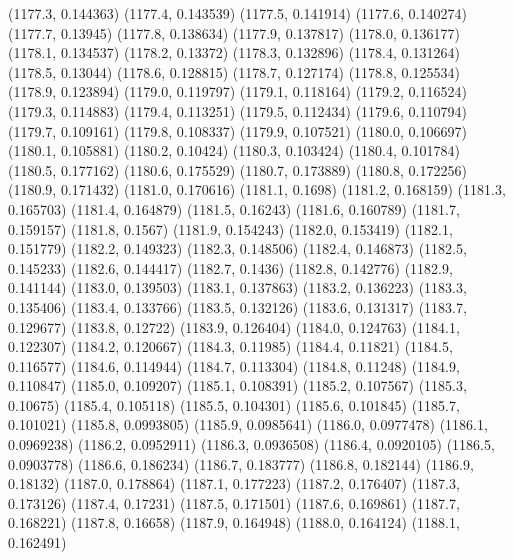{					(1177.3, 0.144363)
					(1177.4, 0.143539)
					(1177.5, 0.141914)
					(1177.6, 0.140274)
					(1177.7, 0.13945)
					(1177.8, 0.138634)
					(1177.9, 0.137817)
					(1178.0, 0.136177)
					(1178.1, 0.134537)
					(1178.2, 0.13372)
					(1178.3, 0.132896)
					(1178.4, 0.131264)
					(1178.5, 0.13044)
					(1178.6, 0.128815)
					(1178.7, 0.127174)
					(1178.8, 0.125534)
					(1178.9, 0.123894)
					(1179.0, 0.119797)
					(1179.1, 0.118164)
					(1179.2, 0.116524)
					(1179.3, 0.114883)
					(1179.4, 0.113251)
					(1179.5, 0.112434)
					(1179.6, 0.110794)
					(1179.7, 0.109161)
					(1179.8, 0.108337)
					(1179.9, 0.107521)
					(1180.0, 0.106697)
					(1180.1, 0.105881)
					(1180.2, 0.10424)
					(1180.3, 0.103424)
					(1180.4, 0.101784)
					(1180.5, 0.177162)
					(1180.6, 0.175529)
					(1180.7, 0.173889)
					(1180.8, 0.172256)
					(1180.9, 0.171432)
					(1181.0, 0.170616)
					(1181.1, 0.1698)
					(1181.2, 0.168159)
					(1181.3, 0.165703)
					(1181.4, 0.164879)
					(1181.5, 0.16243)
					(1181.6, 0.160789)
					(1181.7, 0.159157)
					(1181.8, 0.1567)
					(1181.9, 0.154243)
					(1182.0, 0.153419)
					(1182.1, 0.151779)
					(1182.2, 0.149323)
					(1182.3, 0.148506)
					(1182.4, 0.146873)
					(1182.5, 0.145233)
					(1182.6, 0.144417)
					(1182.7, 0.1436)
					(1182.8, 0.142776)
					(1182.9, 0.141144)
					(1183.0, 0.139503)
					(1183.1, 0.137863)
					(1183.2, 0.136223)
					(1183.3, 0.135406)
					(1183.4, 0.133766)
					(1183.5, 0.132126)
					(1183.6, 0.131317)
					(1183.7, 0.129677)
					(1183.8, 0.12722)
					(1183.9, 0.126404)
					(1184.0, 0.124763)
					(1184.1, 0.122307)
					(1184.2, 0.120667)
					(1184.3, 0.11985)
					(1184.4, 0.11821)
					(1184.5, 0.116577)
					(1184.6, 0.114944)
					(1184.7, 0.113304)
					(1184.8, 0.11248)
					(1184.9, 0.110847)
					(1185.0, 0.109207)
					(1185.1, 0.108391)
					(1185.2, 0.107567)
					(1185.3, 0.10675)
					(1185.4, 0.105118)
					(1185.5, 0.104301)
					(1185.6, 0.101845)
					(1185.7, 0.101021)
					(1185.8, 0.0993805)
					(1185.9, 0.0985641)
					(1186.0, 0.0977478)
					(1186.1, 0.0969238)
					(1186.2, 0.0952911)
					(1186.3, 0.0936508)
					(1186.4, 0.0920105)
					(1186.5, 0.0903778)
					(1186.6, 0.186234)
					(1186.7, 0.183777)
					(1186.8, 0.182144)
					(1186.9, 0.18132)
					(1187.0, 0.178864)
					(1187.1, 0.177223)
					(1187.2, 0.176407)
					(1187.3, 0.173126)
					(1187.4, 0.17231)
					(1187.5, 0.171501)
					(1187.6, 0.169861)
					(1187.7, 0.168221)
					(1187.8, 0.16658)
					(1187.9, 0.164948)
					(1188.0, 0.164124)
					(1188.1, 0.162491)
}
